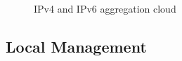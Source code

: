 \begin{figure}
  \begin{minipage}[h]{0.50\textwidth}
    \centering
  \end{minipage}
  \begin{minipage}[h]{0.50\textwidth}
    \centering
  \end{minipage}
\caption{\label{fig:v4-v6-cloud}IPv4 and IPv6 aggregation cloud}
\end{figure}

\subsection{Local Management}

